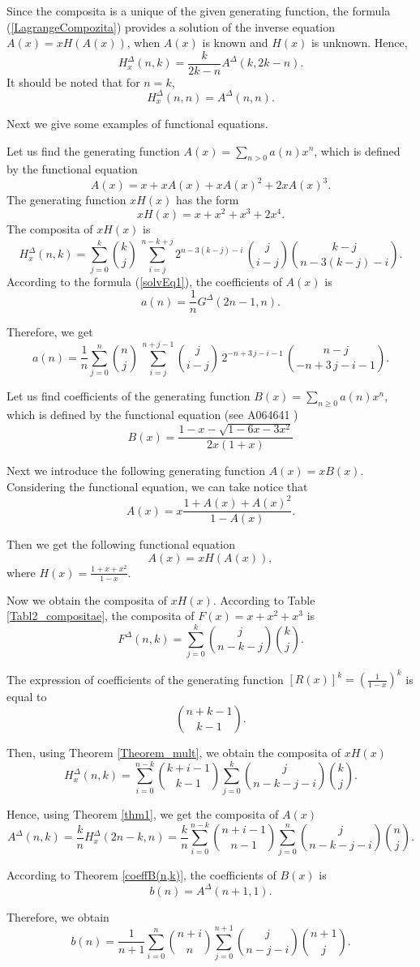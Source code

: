 \documentclass[12pt]{article}
\begin{document}
Since the composita is a unique of the given generating function, the formula (\ref{LagrangeCompozita}) provides a solution of the inverse equation $A(x)=xH(A(x))$, when $A(x)$ is known and $H(x)$ is unknown. Hence,
$$
H_x^{\Delta}(n,k)=\frac{k}{2k-n}A^{\Delta}(k,2k-n).
$$
It should be noted that for $n=k$,
$$
H_x^{\Delta}(n,n)=A^{\Delta}(n,n).
$$

Next we give some examples of functional equations.

\begin{example} 
Let us find the generating function $A(x)=\sum_{n>0}a(n)x^n$, which is defined by the functional equation
$$
A(x)=x+xA(x)+xA(x)^2+2xA(x)^3. 
$$
The generating function $xH(x)$ has the form
$$
xH(x)=x+x^2+x^3+2x^4.
$$
The composita of $xH(x)$  is
$$
H_x^{\Delta}(n,k)=\sum\limits_{j=0}^{k}{{{k}\choose{j}}\,\sum\limits_{i=j}^{n-k+j}{2^{n-3(k-j)-i}\,{{j
 }\choose{i-j}}{{k-j}\choose{n-3(k-j)-i}}}}.
$$
According to the formula (\ref{solvEq1}), the coefficients of $A(x)$ is
$$a(n)=\frac{1}{n}G^{\Delta}(2n-1,n).$$

Therefore, we get 
$$
a(n)=\frac{1}{n}{{\sum\limits_{j=0}^{n}{{{n}\choose{j}}\,\sum\limits_{i=j}^{n+j-1}{{{j}\choose{i-
 j}}\,2^{-n+3\,j-i-1}\,{{n-j}\choose{-n+3\,j-i-1}}}}}}.
$$
\end{example}

\begin{example} 
Let us find coefficients of the generating function $B(x)=\sum_{n\geq 0}a(n)x^n$, which is defined by the functional equation (see A064641 \cite{oeis})
$$
B(x)=\frac{1-x-\sqrt{1-6x-3x^2}}{ 2x(1+x)}
$$

Next we introduce the following generating function $A(x)=xB(x)$.
Considering the functional equation, we can take notice that
$$A(x) =x\frac{1+A(x) +A(x) ^2}{1-A(x)}.$$

Then we get the following functional equation
$$
A(x) = xH(A(x)),
$$
where $H(x) = \frac{1+x+x^2}{1-x}$.

Now we obtain the composita of $xH(x)$.
According to Table \ref{Tabl2_compositae}, the composita of $F(x)= x+x^2+x^3$ is
$$
F^{\Delta}(n,k)=\sum_{j=0}^k {j \choose n-k-j}{k \choose j}. 
$$

The expression of coefficients of the generating function $[R(x)]^k=\left(\frac{1}{1-x}\right)^k$ is equal to
$${n+k-1 \choose k-1}.$$

Then, using Theorem \ref{Theorem_mult}, we obtain the composita of $xH(x)$
$$
H_x^{\Delta}(n,k)=\sum_{i=0}^{n-k}{k+i-1 \choose k-1}\sum_{j=0}^{k}{j \choose n-k-j-i}{k \choose j}.
$$

Hence, using Theorem \ref{thm1}, we get the composita of $A(x)$
$$
A^{\Delta}(n,k)=\frac{k}{n}H_x^{\Delta}(2n-k,n)=\frac{k}{n}\sum_{i=0}^{n-k}{n+i-1 \choose n-1}\sum_{j=0}^{n}{j \choose n-k-j-i}{n \choose j}.
$$

According to Theorem \ref{coeffB(n,k)}, the coefficients of $B(x)$ is
$$b(n)=A^{\Delta}(n+1,1).$$

Therefore, we obtain
$$
b(n)=\frac{1}{n+1}\sum_{i=0}^{n}{n+i \choose n}\sum_{j=0}^{n+1}{j \choose n-j-i}{n+1 \choose j}.
$$
\end{example}
\end{document}
